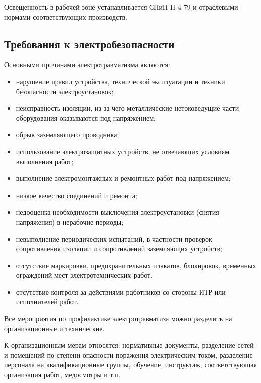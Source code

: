         Освещенность в рабочей зоне устанавливается СНиП II-4-79 и отраслевыми
        нормами соответствующих производств.

    \subsection{Требования к электробезопасности}

        Основными причинами электротравматизма являются:
        \begin{itemize}
            \item нарушение  правил устройства,  технической  эксплуатации и
                техники безопасности электроустановок;
            \item неисправность изоляции, из-за чего металлические
                нетоковедущие части оборудования оказываются под напряжением;
            \item обрыв заземляющего проводника;
            \item использование электрозащитных устройств, не отвечающих
                условиям выполнения работ;
            \item выполнение электромонтажных и ремонтных работ под напряжением;
            \item низкое качество соединений и ремонта;
            \item недооценка  необходимости  выключения электроустановки
                (снятия напряжения) в нерабочие периоды;
            \item невыполнение периодических испытаний, в частности проверок
                сопротивления изоляции и сопротивлений заземляющих устройств;
            \item отсутствие маркировки, предохранительных плакатов,
                блокировок, временных ограждений мест электротехнических работ.
            \item отсутствие контроля за действиями работников со стороны ИТР
                или исполнителей работ.
        \end{itemize}

        Все мероприятия по профилактике электротравматиза можно разделить на
        организационные и технические.

        К организационным мерам относятся: нормативные документы, разделение
        сетей и помещений по степени опасности поражения электрическим током,
        разделение персонала на квалификационные группы, обучение, инструктаж,
        соответствующая организация работ, медосмотры и т.п.
    
